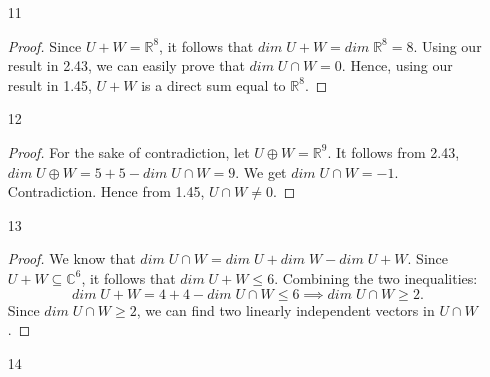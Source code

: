 \documentclass{article}
\begin{document}
\begin{enumerate}
\begin{proof}
\end{proof}
\item[11]
\begin{proof}
Since $U + W = \mathbb{R}^8$, it follows that $dim\;U+W = dim \; \mathbb{R}^8 = 8 $. Using our result in 2.43, we can easily prove that $dim \; U \cap W = 0$. Hence, using our result in 1.45, $U+W$ is a direct sum equal to $\mathbb{R}^8$.
\end{proof}
\item[12]
\begin{proof}
For the sake of contradiction, let $U \oplus W = \mathbb{R}^9$. It follows from 2.43, $dim \; U \oplus W = 5 + 5 - dim \; U \cap W = 9$. We get $dim\; U \cap W = -1$. Contradiction. Hence from 1.45, $U \cap W \neq 0$.
\end{proof}
\item[13]
\begin{proof}
We know that $dim\; U \cap W = dim\; U + dim\; W - dim\; U+W$. Since $U+W \subseteq \mathbb{C}^6$, it follows that $dim\; U+W \leq 6$. Combining the two inequalities:
\begin{equation*}
dim\; U+W = 4+4-dim\;U \cap W \leq 6 \implies dim \; U \cap W \geq 2.
\end{equation*}
Since $dim\; U \cap W \geq 2$, we can find two linearly independent vectors in $U \cap W$.
\end{proof}
\item[14]


\end{enumerate}
\end{document}
